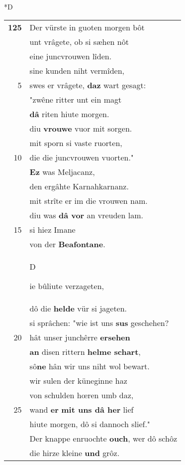 \documentclass[8pt,a4paper,notitlepage]{article}
\begin{document}
\begin{table}[ht]
\begin{minipage}[t]{0.5\linewidth}
\small
\begin{center}*D
\end{center}
\begin{tabular}{rl}
\textbf{125} & Der vürste in guoten morgen bôt\\ 
 & unt vrâgete, ob si sæhen nôt\\ 
 & eine juncvrouwen lîden.\\ 
 & sine kunden niht vermîden,\\ 
5 & swes er vrâgete, \textbf{daz} wart gesagt:\\ 
 & "zwêne ritter unt ein magt\\ 
 & \textbf{dâ} riten hiute morgen.\\ 
 & diu \textbf{vrouwe} vuor mit sorgen.\\ 
 & mit sporn si vaste ruorten,\\ 
10 & die die juncvrouwen vuorten."\\ 
 & \textbf{Ez} was Meljacanz,\\ 
 & den ergâhte Karnahkarnanz.\\ 
 & mit strîte er im die vrouwen nam.\\ 
 & diu was \textbf{dâ vor} an vreuden lam.\\ 
15 & si hiez Imane\\ 
 & von der \textbf{Beafontane}.\\ 
 & \begin{large}D\end{large}ie bûliute verzageten,\\ 
 & dô die \textbf{helde} vür si jageten.\\ 
 & si sprâchen: "wie ist uns \textbf{sus} geschehen?\\ 
20 & hât unser junchêrre \textbf{ersehen}\\ 
 & \textbf{an} disen rittern \textbf{helme schart},\\ 
 & sô\textbf{ne} hân wir uns niht wol bewart.\\ 
 & wir sulen der küneginne haz\\ 
 & von schulden hœren umb daz,\\ 
25 & wand \textbf{er} \textbf{mit uns dâ her} lief\\ 
 & hiute morgen, dô si dannoch slief."\\ 
 & Der knappe enruochte \textbf{ouch}, wer dô schôz\\ 
 & die hirze kleine \textbf{und} grôz.\\ 

\end{tabular}
\end{minipage}
\end{table}
\end{document}
